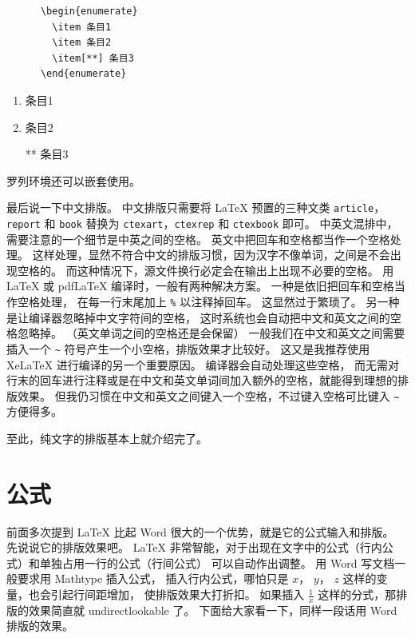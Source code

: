 \vspace{1.2em}
\begin{minipage}{0.5\textwidth}
\small
\begin{verbatim}
      \begin{enumerate}
        \item 条目1
        \item 条目2
        \item[**] 条目3
      \end{enumerate}
\end{verbatim}
\end{minipage}\qquad\begin{minipage}{0.3\textwidth}
\begin{enumerate}
  \item 条目1
  \item 条目2
  \item[**] 条目3
\end{enumerate}
\end{minipage}

\vspace{1.2em}\noindent
罗列环境还可以嵌套使用。

最后说一下中文排版。
中文排版只需要将 \LaTeX{} 预置的三种文类 
\texttt{article}，\texttt{report} 和 \texttt{book}
替换为 \texttt{ctexart}，\texttt{ctexrep} 和 \texttt{ctexbook} 即可。
中英文混排中，需要注意的一个细节是中英之间的空格。
英文中把回车和空格都当作一个空格处理。
这样处理，显然不符合中文的排版习惯，因为汉字不像单词，之间是不会出现空格的。
而这种情况下，源文件换行必定会在输出上出现不必要的空格。
用 LaTeX 或 pdfLaTeX 编译时，一般有两种解决方案。
一种是依旧把回车和空格当作空格处理，
在每一行末尾加上 \verb|%| 以注释掉回车。
这显然过于繁琐了。
另一种是让编译器忽略掉中文字符间的空格，
这时系统也会自动把中文和英文之间的空格忽略掉。
（英文单词之间的空格还是会保留）
一般我们在中文和英文之间需要插入一个 \verb|~| 符号产生一个小空格，排版效果才比较好。
这又是我推荐使用 XeLaTeX 进行编译的另一个重要原因。
编译器会自动处理这些空格，
而无需对行末的回车进行注释或是在中文和英文单词间加入额外的空格，就能得到理想的排版效果。
但我仍习惯在中文和英文之间键入一个空格，不过键入空格可比键入 \verb|~| 方便得多。

至此，纯文字的排版基本上就介绍完了。


\section{公式}

前面多次提到 \LaTeX{} 比起 Word 很大的一个优势，就是它的公式输入和排版。
先说说它的排版效果吧。
\LaTeX{} 非常智能，对于出现在文字中的公式（行内公式）和单独占用一行的公式（行间公式）
可以自动作出调整。
用 Word 写文档一般要求用 Mathtype 插入公式，
插入行内公式，哪怕只是 $x$， $y$， $z$ 这样的变量，也会引起行间距增加，
使排版效果大打折扣。
如果插入 $\frac{1}{x}$ 这样的分式，那排版的效果简直就 undirectlookable 了。
下面给大家看一下，同样一段话用 Word 排版的效果。

